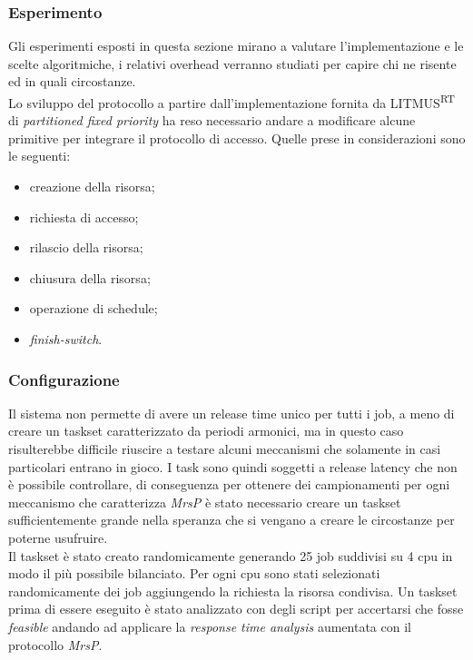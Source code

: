 \subsubsection{Esperimento}
\label{sec:overhead_exp}

\noindent Gli esperimenti esposti in questa sezione mirano a valutare l'implementazione e le scelte algoritmiche, i relativi overhead verranno studiati per capire chi ne risente ed in quali circostanze.\\

\noindent Lo sviluppo del protocollo a partire dall'implementazione fornita da LITMUS\textsuperscript{RT} di \textit{partitioned fixed priority} ha reso necessario andare a modificare alcune primitive per integrare il protocollo di accesso. Quelle prese in considerazioni sono le seguenti:

\begin{itemize}
	\item creazione della risorsa;
	\item richiesta di accesso;
	\item rilascio della risorsa;
	\item chiusura della risorsa;
	\item operazione di schedule;
	\item \textit{finish-switch}.
\end{itemize}

\subsubsection{Configurazione}
\label{sec:overhead_conf}


\noindent Il sistema non permette di avere un release time unico per tutti i job, a meno di creare un taskset caratterizzato da periodi armonici, ma in questo caso risulterebbe difficile riuscire a testare alcuni meccanismi che solamente in casi particolari entrano in gioco. I task sono quindi soggetti a release latency che non è possibile controllare, di conseguenza per ottenere dei campionamenti per ogni meccanismo che caratterizza \textit{MrsP} è stato necessario creare un taskset sufficientemente grande nella speranza che si vengano a creare le circostanze per poterne usufruire.\\
\noindent Il taskset è stato creato randomicamente generando 25 job suddivisi su 4 cpu in modo il più possibile bilanciato. Per ogni cpu sono stati selezionati randomicamente dei job aggiungendo la richiesta la risorsa condivisa. Un taskset prima di essere eseguito è stato analizzato con degli script per accertarsi che fosse \textit{feasible} andando ad applicare la \textit{response time analysis} aumentata con il protocollo \textit{MrsP}.\\

